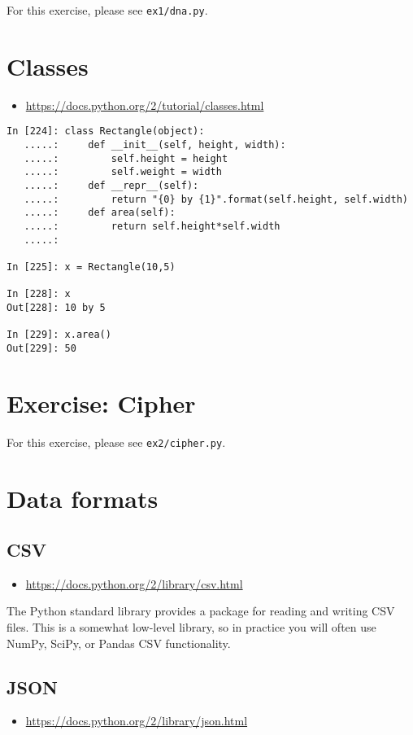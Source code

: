 For this exercise, please see \texttt{ex1/dna.py}.

\section{Classes}
\begin{itemize}
\item \url{https://docs.python.org/2/tutorial/classes.html}
\end{itemize}

\begin{verbatim}
In [224]: class Rectangle(object):
   .....:     def __init__(self, height, width):
   .....:         self.height = height
   .....:         self.weight = width
   .....:     def __repr__(self):
   .....:         return "{0} by {1}".format(self.height, self.width)
   .....:     def area(self):
   .....:         return self.height*self.width
   .....:     

In [225]: x = Rectangle(10,5)

In [228]: x
Out[228]: 10 by 5

In [229]: x.area()
Out[229]: 50
\end{verbatim}

\section{Exercise: Cipher}

For this exercise, please see \texttt{ex2/cipher.py}.

\section{Data formats}

\subsection{CSV}
\begin{itemize}
\item \url{https://docs.python.org/2/library/csv.html}
\end{itemize}

The Python standard library provides a package for reading and writing CSV
files.  This is a somewhat low-level library, so in practice you will
often use NumPy, SciPy, or Pandas CSV functionality.

\subsection{JSON}
\begin{itemize}
\item \url{https://docs.python.org/2/library/json.html}
\end{itemize}

